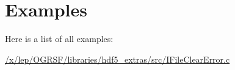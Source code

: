 \section{Examples}
Here is a list of all examples\+:\begin{DoxyCompactItemize}
\item 
\hyperlink{_2x_2lep_2OGRSF_2libraries_2hdf5_extras_2src_2IFileClearError_8c-example}{/x/lep/\+O\+G\+R\+S\+F/libraries/hdf5\+\_\+extras/src/\+I\+File\+Clear\+Error.\+c}
\end{DoxyCompactItemize}
